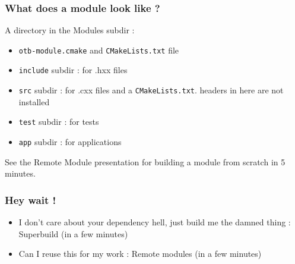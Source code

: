 \documentclass[8pt]{beamer}
\begin{document}
\begin{frame}
\frametitle{What does a module look like ?}
A directory in the Modules subdir :
\begin{itemize}
\item \texttt{otb-module.cmake} and \texttt{CMakeLists.txt} file
\item \texttt{include} subdir : for .hxx files
\item \texttt{src} subdir : for .cxx files and a \texttt{CMakeLists.txt}. headers in here are not installed
\item \texttt{test} subdir : for tests
\item \texttt{app} subdir : for applications
\end{itemize}

See the Remote Module presentation for building a module from scratch in 5 minutes.
\end{frame}


\begin{frame}
\frametitle{Hey wait !}
\begin{itemize}
\item I don't care about your dependency hell, just build me the damned thing : Superbuild (in a few minutes)
\item Can I reuse this for my work : Remote modules  (in a few minutes)
\end{itemize}
\end{frame}
\end{document}
